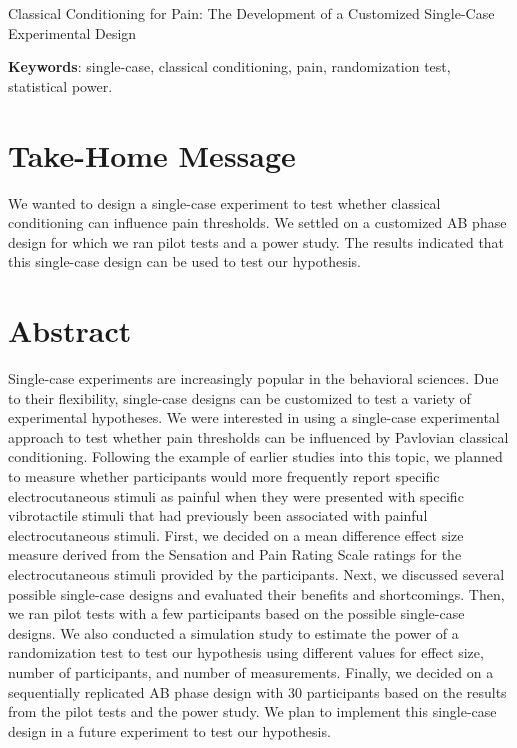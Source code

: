 \documentclass{article}
\begin{document}
  

Classical Conditioning for Pain: The Development of a Customized Single-Case Experimental Design









\textbf{Keywords}: single-case, classical conditioning, pain, randomization test, statistical power.

\section{Take-Home Message}

We wanted to design a single-case experiment to test whether classical conditioning can influence pain thresholds. We settled on a customized AB phase design for which we ran pilot tests and a power study. The results indicated that this single-case design can be used to test our hypothesis.

\section{Abstract}

Single-case experiments are increasingly popular in the behavioral sciences. Due to their flexibility, single-case designs can be customized to test a variety of experimental hypotheses. We were interested in using a single-case experimental approach to test whether pain thresholds can be influenced by Pavlovian classical conditioning. Following the example of earlier studies into this topic, we planned to measure whether participants would more frequently report specific electrocutaneous stimuli as painful when they were presented with specific vibrotactile stimuli that had previously been associated with painful electrocutaneous stimuli. First, we decided on a mean difference effect size measure derived from the Sensation and Pain Rating Scale ratings for the electrocutaneous stimuli provided by the participants. Next, we discussed several possible single-case designs and evaluated their benefits and shortcomings. Then, we ran pilot tests with a few participants based on the possible single-case designs. We also conducted a simulation study to estimate the power of a randomization test to test our hypothesis using different values for effect size, number of participants, and number of measurements. Finally, we decided on a sequentially replicated AB phase design with 30 participants based on the results from the pilot tests and the power study. We plan to implement this single-case design in a future experiment to test our hypothesis. 
\end{document}
